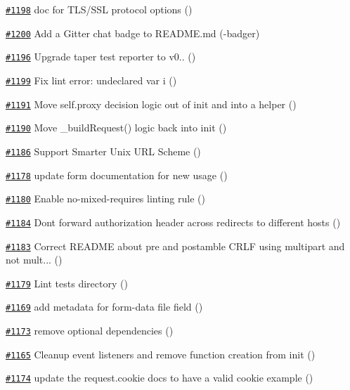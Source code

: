 \begin{DoxyItemize}
\item \href{https://github.com/request/request/pull/1198}{\tt \#1198} doc for T\+L\+S/\+S\+SL protocol options ()
\item \href{https://github.com/request/request/pull/1200}{\tt \#1200} Add a Gitter chat badge to R\+E\+A\+D\+M\+E.\+md (-\/badger)
\item \href{https://github.com/request/request/pull/1196}{\tt \#1196} Upgrade taper test reporter to v0.. ()
\item \href{https://github.com/request/request/pull/1199}{\tt \#1199} Fix lint error\+: undeclared var i ()
\item \href{https://github.com/request/request/pull/1191}{\tt \#1191} Move self.\+proxy decision logic out of init and into a helper ()
\item \href{https://github.com/request/request/pull/1190}{\tt \#1190} Move \+\_\+build\+Request() logic back into init ()
\item \href{https://github.com/request/request/pull/1186}{\tt \#1186} Support Smarter Unix U\+RL Scheme ()
\item \href{https://github.com/request/request/pull/1178}{\tt \#1178} update form documentation for new usage ()
\item \href{https://github.com/request/request/pull/1180}{\tt \#1180} Enable no-\/mixed-\/requires linting rule ()
\item \href{https://github.com/request/request/pull/1184}{\tt \#1184} Don\textquotesingle{}t forward authorization header across redirects to different hosts ()
\item \href{https://github.com/request/request/pull/1183}{\tt \#1183} Correct R\+E\+A\+D\+ME about pre and postamble C\+R\+LF using multipart and not mult... ()
\item \href{https://github.com/request/request/pull/1179}{\tt \#1179} Lint tests directory ()
\item \href{https://github.com/request/request/pull/1169}{\tt \#1169} add metadata for form-\/data file field ()
\item \href{https://github.com/request/request/pull/1173}{\tt \#1173} remove optional dependencies ()
\item \href{https://github.com/request/request/pull/1165}{\tt \#1165} Cleanup event listeners and remove function creation from init ()
\item \href{https://github.com/request/request/pull/1174}{\tt \#1174} update the request.\+cookie docs to have a valid cookie example ()

\end{DoxyItemize}
